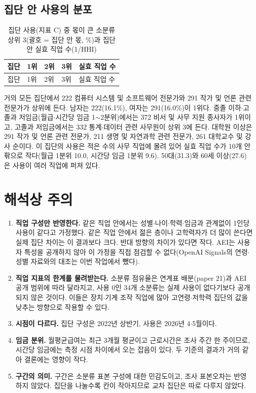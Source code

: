 \documentclass[11pt]{article}
\begin{document}
\subsection{집단 안 사용의 분포}

\begin{footnotesize}
\begin{longtable}{L{2.2cm}L{4.4cm}L{4.4cm}L{4.4cm}R{1.4cm}}
\caption{집단 사용(지표 C) 중 몫이 큰 소분류 상위 3(괄호 = 집단 안 몫, \%)과 집단 안 실효 직업 수(1/HHI)}\label{tab:top}\\
\toprule
집단 & 1위 & 2위 & 3위 & 실효 직업 수 \\
\midrule
\endfirsthead
\toprule
집단 & 1위 & 2위 & 3위 & 실효 직업 수 \\
\midrule
\endhead

\bottomrule
\end{longtable}
\end{footnotesize}

거의 모든 집단에서 222 컴퓨터 시스템 및 소프트웨어 전문가와 291 작가 및 언론 관련 전문가가 상위에 든다. 남자는 222(16.1\%), 여자는 291(16.0\%)이 1위다. 중졸 이하$\cdot$고졸과 저임금(월급$\cdot$시간당 임금 1$\sim$2분위)에서는 372 비서 및 사무 지원 종사자가 1위이고, 고졸과 저임금에서는 332 통계$\cdot$데이터 관련 사무원이 상위 3에 든다. 대학원 이상은 291 작가 및 언론 관련 전문가, 211 생명 및 자연과학 관련 전문가, 261 대학교수 및 강사 순이다. 이 집단의 사용은 적은 수의 사무 직업에 몰려 있어 실효 직업 수가 10개 안팎으로 작다(월급 1분위 10.0, 시간당 임금 1분위 9.6). 50대(31.3)와 60세 이상(27.6)은 사용이 여러 직업에 퍼져 있다.

\section{해석상 주의}

\begin{enumerate}[leftmargin=*]
  \item \textbf{직업 구성만 반영한다.} 같은 직업 안에서는 성별$\cdot$나이$\cdot$학력$\cdot$임금과 관계없이 1인당 사용이 같다고 가정했다. 같은 직업 안에서 젊은 층이나 고학력자가 더 많이 쓴다면 실제 집단 차이는 이 결과보다 크다. 반대 방향의 차이가 있다면 작다. AEI는 사용자 특성을 공개하지 않아 이 가정을 직접 점검할 수 없다(OpenAI Signals의 연령$\cdot$성별 자료와의 대조는 이번 작업에서 뺐다).
  \item \textbf{직업 지표의 한계를 물려받는다.} 소분류 점유율은 연계표 배분(paper 21)과 AEI 공개 범위에 따라 달라지고, 사용 0인 34개 소분류는 실제 사용이 없다기보다 공개되지 않은 것이다. 이들은 장치$\cdot$기계 조작 직업에 많아 고연령$\cdot$저학력 집단의 값을 낮추는 방향으로 작용할 수 있다.
  \item \textbf{시점이 다르다.} 집단 구성은 2022년 상반기, 사용은 2026년 4$\cdot$5월이다.
  \item \textbf{임금 분위.} 월평균급여는 최근 3개월 평균이고 근로시간은 조사 주간 한 주이므로, 시간당 임금에는 측정 시점 차이에서 오는 잡음이 있다. 두 기준의 결과가 거의 같아 결론에는 영향이 작다.
  \item \textbf{구간의 의미.} 구간은 소분류 표본 구성에 대한 민감도이고, 조사 표본오차는 반영하지 않았다. 집단을 나눌수록 칸이 작아지므로 교차 집단은 따로 다루지 않았다.
\end{enumerate}
\end{document}
